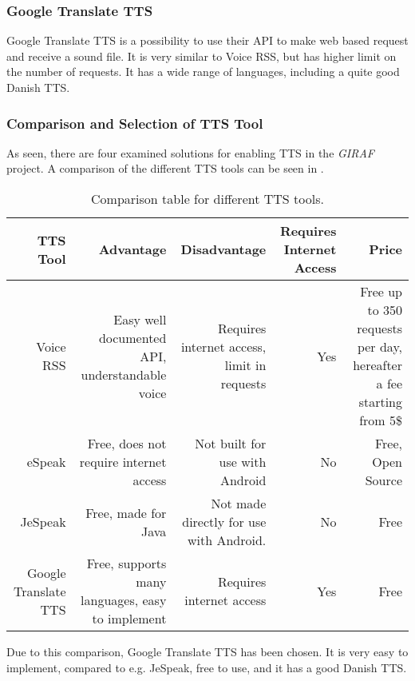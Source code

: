 \subsubsection{Google Translate TTS}
Google Translate TTS is a possibility to use their API to make web based request and receive a sound file. It is very similar to Voice RSS, but has higher limit on the number of requests. It has a wide range of languages, including a quite good Danish TTS. 

\subsubsection{Comparison and Selection of TTS Tool}
As seen, there are four examined solutions for enabling TTS in the \textit{GIRAF} project. A comparison of the different TTS tools can be seen in .


\begin{table}[H]
    \begin{tabularx}{\textwidth}{|R|R|R|R|R|}
    \hline
    \textbf{TTS Tool}             &\textbf{Advantage}                                   &\textbf{Disadvantage}                               & \textbf{Requires Internet Access} &\textbf{Price}                                                      \\ \hline
    Voice RSS            & Easy well documented API, understandable voice    & Requires internet access, limit in requests & Yes                     & Free up to 350 requests per day, hereafter a fee starting from 5\$ \\ \hline
    eSpeak               & Free, does not require internet access            & Not built for use with Android             & No                      & Free, Open Source                                          \\ \hline
    JeSpeak              & Free, made for Java                             & Not made directly for use with Android.    & No                      & Free                                                       \\ \hline
    Google Translate TTS & Free, supports many languages, easy to implement & Requires internet access                    & Yes                     & Free                                                       \\ \hline
    \end{tabularx}
    \caption{Comparison table for different TTS tools.}
    \label{tab:ttscomp}
\end{table}

Due to this comparison, Google Translate TTS has been chosen. It is very easy to implement, compared to e.g. JeSpeak, free to use, and it has a good Danish TTS.